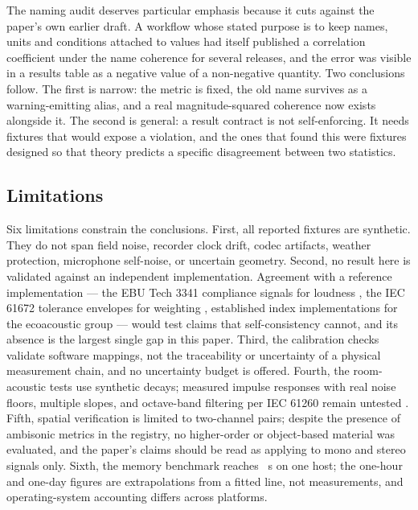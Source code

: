 \documentclass[final]{jaes}
\begin{document}
The naming audit deserves particular emphasis because it cuts against the paper's own earlier draft. A workflow whose stated purpose is to keep names, units and conditions attached to values had itself published a correlation coefficient under the name coherence for several releases, and the error was visible in a results table as a negative value of a non-negative quantity. Two conclusions follow. The first is narrow: the metric is fixed, the old name survives as a warning-emitting alias, and a real magnitude-squared coherence now exists alongside it. The second is general: a result contract is not self-enforcing. It needs fixtures that would expose a violation, and the ones that found this were fixtures designed so that theory predicts a specific disagreement between two statistics.

\subsection{Limitations}
\label{sec:limits}

Six limitations constrain the conclusions. First, all reported fixtures are synthetic. They do not span field noise, recorder clock drift, codec artifacts, weather protection, microphone self-noise, or uncertain geometry. Second, no result here is validated against an independent implementation. Agreement with a reference implementation --- the EBU Tech 3341 compliance signals for loudness \cite{ebu3341}, the IEC 61672 tolerance envelopes for weighting \cite{iec61672}, established index implementations for the ecoacoustic group \cite{ulloa2021,sueur2008} --- would test claims that self-consistency cannot, and its absence is the largest single gap in this paper. Third, the calibration checks validate software mappings, not the traceability or uncertainty of a physical measurement chain, and no uncertainty budget is offered. Fourth, the room-acoustic tests use synthetic decays; measured impulse responses with real noise floors, multiple slopes, and octave-band filtering per IEC 61260 remain untested \cite{iec61260}. Fifth, spatial verification is limited to two-channel pairs; despite the presence of ambisonic metrics in the registry, no higher-order or object-based material was evaluated, and the paper's claims should be read as applying to mono and stereo signals only. Sixth, the memory benchmark reaches \memMaxDuration~s on one host; the one-hour and one-day figures are extrapolations from a fitted line, not measurements, and operating-system accounting differs across platforms.
\end{document}
